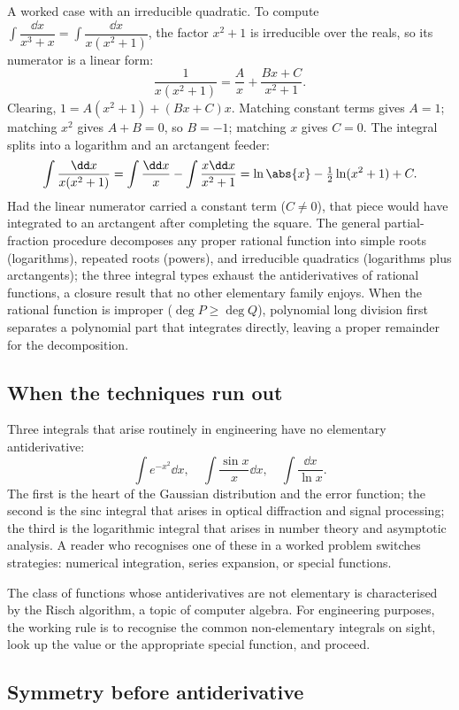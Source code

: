 A worked case with an irreducible quadratic. To compute $\int
\dfrac{\dd x}{x^{3} + x} = \int\dfrac{\dd x}{x(x^{2} + 1)}$, the
factor $x^{2} + 1$ is irreducible over the reals, so its numerator
is a linear form:
\[
\frac{1}{x(x^{2} + 1)} = \frac{A}{x} + \frac{Bx + C}{x^{2} + 1}.
\]
Clearing, $1 = A(x^{2} + 1) + (Bx + C)x$. Matching constant terms
gives $A = 1$; matching $x^{2}$ gives $A + B = 0$, so $B = -1$;
matching $x$ gives $C = 0$. The integral splits into a logarithm
and an arctangent feeder:
\[
\int\frac{\dd x}{x(x^{2}+1)} = \int\frac{\dd x}{x} - \int
\frac{x\dd x}{x^{2}+1} = \ln\abs{x} - \tfrac{1}{2}\ln(x^{2} + 1)
+ C.
\]
Had the linear numerator carried a constant term ($C \neq 0$), that
piece would have integrated to an arctangent after completing the
square. The general partial-fraction procedure decomposes any
proper rational function into simple roots (logarithms), repeated
roots (powers), and irreducible quadratics (logarithms plus
arctangents); the three integral types exhaust the antiderivatives
of rational functions, a closure result that no other elementary
family enjoys. When the rational function is improper ($\deg P \geq
\deg Q$), polynomial long division first separates a polynomial part
that integrates directly, leaving a proper remainder for the
decomposition.

\subsection{When the techniques run out}

Three integrals that arise routinely in engineering have no
elementary antiderivative:
\[
\int e^{-x^{2}} \dd x, \quad
\int \frac{\sin x}{x} \dd x, \quad
\int \frac{\dd x}{\ln x}.
\]
The first is the heart of the Gaussian distribution and the error
function; the second is the sinc integral that arises in optical
diffraction and signal processing; the third is the logarithmic
integral that arises in number theory and asymptotic analysis. A
reader who recognises one of these in a worked problem switches
strategies: numerical integration, series expansion, or special
functions.

The class of functions whose antiderivatives are not elementary is
characterised by the Risch algorithm, a topic of computer algebra.
For engineering purposes, the working rule is to recognise the
common non-elementary integrals on sight, look up the value or
the appropriate special function, and proceed.

\subsection{Symmetry before antiderivative}

